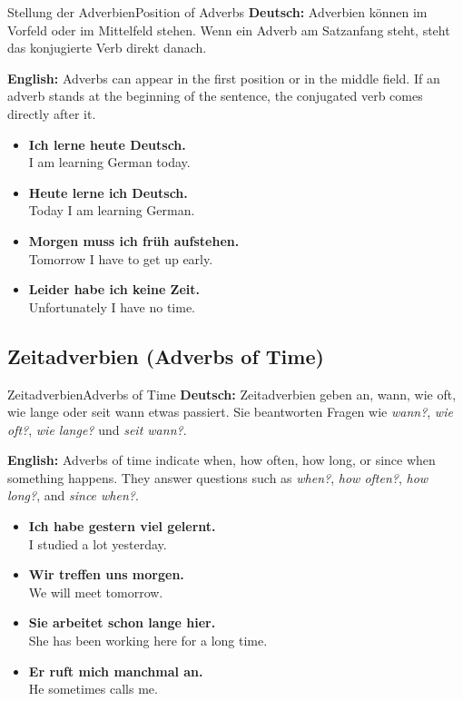 \documentclass[a4paper,11pt]{article}
\newcommand{\GermanText}[1]{\textbf{Deutsch: }#1\par}
\newcommand{\EnglishText}[1]{{\color{SoftGray}\textbf{English: }#1\par}}
\newcommand{\ExampleItem}[2]{\item \textbf{#1}\\{\color{SoftGray}#2}}
\begin{document}
\begin{grammarentry}{Stellung der Adverbien}{Position of Adverbs}
    \GermanText{Adverbien können im Vorfeld oder im Mittelfeld stehen. Wenn ein Adverb am Satzanfang steht, steht das konjugierte Verb direkt danach.}
    \EnglishText{Adverbs can appear in the first position or in the middle field. If an adverb stands at the beginning of the sentence, the conjugated verb comes directly after it.}
    \begin{exbox}
        \begin{itemize}
            \ExampleItem{Ich lerne heute Deutsch.}{I am learning German today.}
            \ExampleItem{Heute lerne ich Deutsch.}{Today I am learning German.}
            \ExampleItem{Morgen muss ich früh aufstehen.}{Tomorrow I have to get up early.}
            \ExampleItem{Leider habe ich keine Zeit.}{Unfortunately I have no time.}
        \end{itemize}
    \end{exbox}
\end{grammarentry}

\subsection{Zeitadverbien {\small (Adverbs of Time)}}

\begin{grammarentry}{Zeitadverbien}{Adverbs of Time}
    \GermanText{Zeitadverbien geben an, wann, wie oft, wie lange oder seit wann etwas passiert. Sie beantworten Fragen wie \textit{wann?}, \textit{wie oft?}, \textit{wie lange?} und \textit{seit wann?}.}
    \EnglishText{Adverbs of time indicate when, how often, how long, or since when something happens. They answer questions such as \textit{when?}, \textit{how often?}, \textit{how long?}, and \textit{since when?}.}
    \begin{exbox}
        \begin{itemize}
            \ExampleItem{Ich habe gestern viel gelernt.}{I studied a lot yesterday.}
            \ExampleItem{Wir treffen uns morgen.}{We will meet tomorrow.}
            \ExampleItem{Sie arbeitet schon lange hier.}{She has been working here for a long time.}
            \ExampleItem{Er ruft mich manchmal an.}{He sometimes calls me.}
        \end{itemize}
    \end{exbox}
\end{grammarentry}
\end{document}
